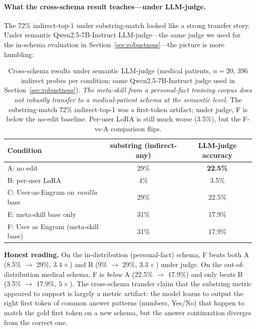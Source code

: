 \documentclass{article}
\begin{document}
\paragraph{What the cross-schema result teaches—under LLM-judge.}
The 72\% indirect-top-1 under substring-match looked like a strong
transfer story. Under semantic Qwen2.5-7B-Instruct LLM-judge—the same
judge we used for the in-schema evaluation in
Section~\ref{sec:robustness}—the picture is more humbling:

\begin{table}[t]
  \centering
  \caption{Cross-schema results under semantic LLM-judge (medical
  patients, $n{=}20$, 396 indirect probes per condition; same
  Qwen2.5-7B-Instruct judge used in Section~\ref{sec:robustness}).
  \emph{The meta-skill from a personal-fact training corpus does
  not robustly transfer to a medical-patient schema at the semantic
  level.} The substring-match 72\% indirect-top-1 was a first-token
  artifact; under judge, F is below the no-edit baseline. Per-user
  LoRA is still much worse (3.5\%), but the F-vs-A comparison
  flips.}
  \label{tab:cross-schema-judge}
  \begin{tabular}{lcc}
    \toprule
    Condition & substring (indirect-any) & LLM-judge accuracy \\
    \midrule
    A: no edit                                  & 29\% & \textbf{22.5\%} \\
    B: per-user LoRA                            & 4\% & 3.5\% \\
    C: User-as-Engram on \emph{vanilla} base    & 29\% & 22.5\% \\
    E: meta-skill base only                     & 31\% & 17.9\% \\
    F: User as Engram (meta-skill base)         & 31\% & 17.9\% \\
    \bottomrule
  \end{tabular}
\end{table}

\textbf{Honest reading.} On the in-distribution (personal-fact)
schema, F beats both A (8.5\% $\to$ 29\%, $3.4{\times}$) and B
(9\% $\to$ 29\%, $3.3{\times}$) under judge. On the
out-of-distribution medical schema, F is \emph{below} A
(22.5\% $\to$ 17.9\%) and only beats B
(3.5\% $\to$ 17.9\%, $5{\times}$). The cross-schema transfer claim
that the substring metric appeared to support is largely a metric
artifact: the model learns to output the right first token of common
answer patterns (numbers, Yes/No) that happen to match the gold first
token on a new schema, but the answer continuation diverges from the
correct one.
\end{document}
